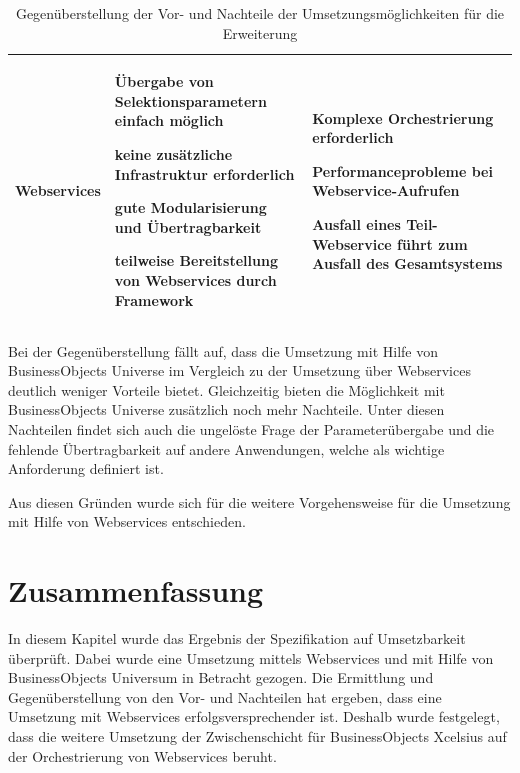 \begin{onehalfspacing}
{\begin{table}[h]
\begin{tabular}{| l | >{\centering\arraybackslash} m{5cm} | >{\centering\arraybackslash} m{5cm} |}
\\	\hline
Webservices 			& 

\begin{seList}
\item Übergabe von Selektionsparametern einfach möglich
\item keine zusätzliche Infrastruktur erforderlich
\item gute Modularisierung und Übertragbarkeit
\item teilweise Bereitstellung von Webservices durch Framework
\end{seList}

& 


\begin{seList}
\item Komplexe Orchestrierung erforderlich
\item Performanceprobleme bei Webservice-Aufrufen
\item Ausfall eines Teil-Webservice führt zum Ausfall des Gesamtsystems
\end{seList}

\\	\hline
\end{tabular} 
\caption{Gegenüberstellung der Vor- und Nachteile der Umsetzungsmöglichkeiten für die Erweiterung \label{table:vergleich_umsetzung}}
\end{table}
}

Bei der Gegenüberstellung fällt auf, dass die Umsetzung mit Hilfe von BusinessObjects Universe im Vergleich zu der Umsetzung über Webservices deutlich weniger Vorteile bietet. Gleichzeitig bieten die Möglichkeit mit BusinessObjects Universe zusätzlich noch mehr Nachteile. Unter diesen Nachteilen findet sich auch die ungelöste Frage der Parameterübergabe und die fehlende Übertragbarkeit auf andere Anwendungen, welche als wichtige Anforderung definiert ist.

Aus diesen Gründen wurde sich für die weitere Vorgehensweise für die Umsetzung mit Hilfe von Webservices entschieden.

\section{Zusammenfassung}
In diesem Kapitel wurde das Ergebnis der Spezifikation auf Umsetzbarkeit überprüft. Dabei wurde eine Umsetzung mittels Webservices  und mit Hilfe von BusinessObjects Universum in Betracht gezogen. Die Ermittlung und Gegenüberstellung von den Vor- und Nachteilen hat ergeben, dass eine Umsetzung mit Webservices erfolgsversprechender ist. Deshalb wurde festgelegt, dass die weitere Umsetzung der Zwischenschicht für BusinessObjects Xcelsius auf der Orchestrierung von Webservices beruht.


\end{onehalfspacing}

